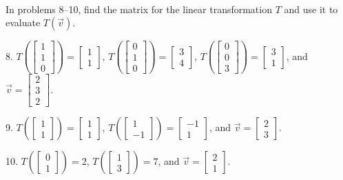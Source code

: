 \documentclass{article}
\begin{document}
~\\

In problems 8--10, find the matrix for the linear transformation $T$ and use it to evaluate $T(\vec{v})$.

8. $T\left( \left[\begin{array}{c} 1 \\ 1 \\ 0 \end{array}\right] \right) = \left[\begin{array}{c} 1 \\ 1 \end{array}\right]$, $T\left( \left[\begin{array}{c} 0 \\ 1 \\ 0 \end{array}\right] \right) = \left[\begin{array}{c} 3 \\ 4 \end{array}\right]$, $T\left( \left[\begin{array}{c} 0 \\ 0 \\ 3 \end{array}\right] \right) = \left[\begin{array}{c} 3 \\ 1 \end{array}\right]$, and $\vec{v} = \left[\begin{array}{c} 2 \\ 3 \\ 2 \end{array}\right]$.

9. $T\left( \left[\begin{array}{c} 1 \\ 1 \end{array}\right] \right) = \left[\begin{array}{c} 1 \\ 1 \end{array}\right]$, $T\left( \left[\begin{array}{c} 1 \\ -1 \end{array}\right] \right) = \left[\begin{array}{c} -1 \\ 1 \end{array}\right]$, and $\vec{v} = \left[\begin{array}{c} 2 \\ 3 \end{array}\right]$.

10. $T\left( \left[\begin{array}{c} 0 \\ 1 \end{array}\right] \right) = 2$, $T\left( \left[\begin{array}{c} 1 \\ 3 \end{array}\right] \right) = 7$, and $\vec{v} = \left[\begin{array}{c} 2 \\ 1 \end{array}\right]$.
\end{document}
